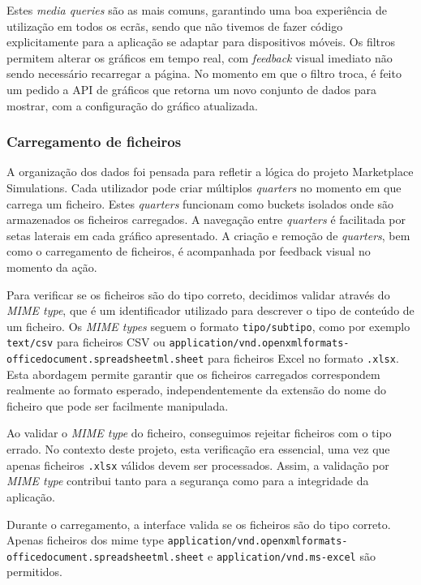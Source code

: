 Estes \textit{media queries} são as mais comuns, garantindo uma boa experiência de utilização em todos os ecrãs, sendo que não tivemos de fazer código explicitamente para a aplicação se adaptar para dispositivos móveis. Os filtros permitem alterar os gráficos em tempo real, com \textit{feedback} visual imediato não sendo necessário recarregar a página. No momento em que o filtro troca, é feito um pedido a API de gráficos que retorna um novo conjunto de dados para mostrar, com a configuração do gráfico atualizada.

\subsubsection{Carregamento de ficheiros}

A organização dos dados foi pensada para refletir a lógica do projeto Marketplace Simulations. Cada utilizador pode criar múltiplos \textit{quarters} no momento em que carrega um ficheiro. Estes \textit{quarters} funcionam como buckets isolados onde são armazenados os ficheiros carregados. A navegação entre \textit{quarters} é facilitada por setas laterais em cada gráfico apresentado. A criação e remoção de \textit{quarters}, bem como o carregamento de ficheiros, é acompanhada por feedback visual no momento da ação.

Para verificar se os ficheiros são do tipo correto, decidimos validar através do \textit{MIME type}, que é um identificador  utilizado para descrever o tipo de conteúdo de um ficheiro. Os \textit{MIME types} seguem o formato \texttt{tipo/subtipo}, como por exemplo \texttt{text/csv} para ficheiros CSV ou \texttt{application/vnd.openxmlformats-officedocument.spreadsheetml.sheet} para ficheiros Excel no formato \texttt{.xlsx}. Esta abordagem permite garantir que os ficheiros carregados correspondem realmente ao formato esperado, independentemente da extensão do nome do ficheiro que pode ser facilmente manipulada. 

Ao validar o \textit{MIME type} do ficheiro, conseguimos rejeitar ficheiros com o tipo errado. No contexto deste projeto, esta verificação era essencial, uma vez que apenas ficheiros \texttt{.xlsx} válidos devem ser processados. Assim, a validação por \textit{MIME type} contribui tanto para a segurança como para a integridade da aplicação.

Durante o carregamento, a interface valida se os ficheiros são do tipo correto. Apenas ficheiros dos mime type \texttt{application/vnd.openxmlformats-officedocument.spreadsheetml.sheet} e \texttt{application/vnd.ms-excel} são permitidos.

